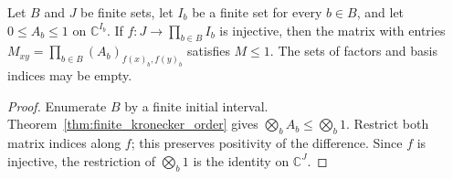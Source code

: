 \begin{corollary}
    \label{cor:finite_kronecker_contractions}
    \leanok
    Let $B$ and $J$ be finite sets, let $I_b$ be a finite set for every $b\in B$,
    and let $0\le A_b\le1$ on $\mathbb C^{I_b}$. If
    $f:J\to\prod_{b\in B}I_b$ is injective, then the matrix with entries
    $M_{xy}=\prod_{b\in B}(A_b)_{f(x)_b,f(y)_b}$ satisfies $M\le1$.
    The sets of factors and basis indices may be empty.
\end{corollary}
\begin{proof}\leanok
    Enumerate $B$ by a finite initial interval. Theorem~\ref{thm:finite_kronecker_order}
    gives $\bigotimes_b A_b\le\bigotimes_b1$. Restrict both matrix indices along $f$;
    this preserves positivity of the difference. Since $f$ is injective, the
    restriction of $\bigotimes_b1$ is the identity on $\mathbb C^J$.
\end{proof}
